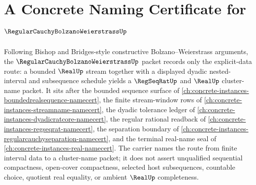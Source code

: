 \chapter{A Concrete Naming Certificate for $\RegularCauchyBolzanoWeierstrassUp$}
\label{ch:concrete-instances-regular-cauchy-bolzano-weierstrass-namecert}

Following Bishop and Bridges-style constructive Bolzano--Weierstrass arguments, the $\RegularCauchyBolzanoWeierstrassUp$ packet records only the explicit-data route: a bounded $\RealUp$ stream together with a displayed dyadic nested-interval and subsequence schedule yields a $\RegSeqRatUp$ and $\RealUp$ cluster-name packet. It sits after the bounded sequence surface of \autoref{ch:concrete-instances-boundedrealsequence-namecert}, the finite stream-window rows of \autoref{ch:concrete-instances-streamname-namecert}, the dyadic tolerance ledger of \autoref{ch:concrete-instances-dyadicratcore-namecert}, the regular rational readback of \autoref{ch:concrete-instances-regseqrat-namecert}, the separation boundary of \autoref{ch:concrete-instances-regularcauchyseparation-namecert}, and the terminal real-name seal of \autoref{ch:concrete-instances-real-namecert}. The carrier names the route from finite interval data to a cluster-name packet; it does not assert unqualified sequential compactness, open-cover compactness, selected host subsequences, countable choice, quotient real equality, or ambient $\RealUp$ completeness.

